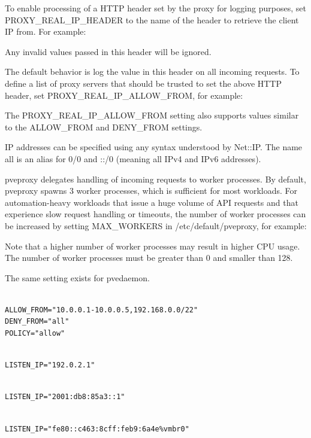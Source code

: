 To enable processing of a HTTP header set by the proxy for logging purposes, set PROXY_REAL_IP_HEADER to the name of the header to retrieve the client IP from. For example:

Any invalid values passed in this header will be ignored.

The default behavior is log the value in this header on all incoming requests. To define a list of proxy servers that should be trusted to set the above HTTP header, set PROXY_REAL_IP_ALLOW_FROM, for example:

The PROXY_REAL_IP_ALLOW_FROM setting also supports values similar to the ALLOW_FROM and DENY_FROM settings.

IP addresses can be specified using any syntax understood by Net::IP. The name all is an alias for 0/0 and ::/0 (meaning all IPv4 and IPv6 addresses).

pveproxy delegates handling of incoming requests to worker processes. By default, pveproxy spawns 3 worker processes, which is sufficient for most workloads. For automation-heavy workloads that issue a huge volume of API requests and that experience slow request handling or timeouts, the number of worker processes can be increased by setting MAX_WORKERS in /etc/default/pveproxy, for example:

Note that a higher number of worker processes may result in higher CPU usage. The number of worker processes must be greater than 0 and smaller than 128.

The same setting exists for pvedaemon.

\begin{lstlisting}

ALLOW_FROM="10.0.0.1-10.0.0.5,192.168.0.0/22"
DENY_FROM="all"
POLICY="allow"

\end{lstlisting}

\begin{lstlisting}

LISTEN_IP="192.0.2.1"

\end{lstlisting}

\begin{lstlisting}

LISTEN_IP="2001:db8:85a3::1"

\end{lstlisting}

\begin{lstlisting}

LISTEN_IP="fe80::c463:8cff:feb9:6a4e%vmbr0"

\end{lstlisting}

